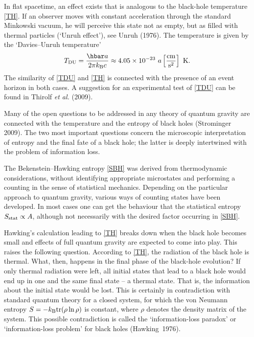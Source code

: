 \documentclass[12pt,a4paper]{article}
\newcommand{\be}{\begin{equation}}
\newcommand{\ee}{\end{equation}}
\newcommand{\lb}{\label}
\begin{document}
In flat spacetime, an effect exists that is analogous to the
black-hole temperature \eqref{TH}. If an observer moves with constant
acceleration through the standard Minkowski vacuum, he will perceive this
state not as empty, but as filled with thermal particles (`Unruh
effect'), see Unruh (1976). The temperature is given by the
`Davies--Unruh temperature' 
\be 
\lb{TDU}
T_{\rm DU}= \frac{\hbar a}{2\pi k_{\rm B}c}\approx 4.05\times 10^{-23}
\ a\left[\frac{\rm cm}{{\rm s}^2}\right]\ {\rm K} .
\ee
The similarity of \eqref{TDU} and \eqref{TH} is connected with the
presence of an event horizon in both cases. A suggestion for an
experimental test of \eqref{TDU} can be found in Thirolf {\em et al.}
(2009). 

Many of the open questions to be addressed
in any theory of quantum gravity are connected with the temperature
and the entropy of black holes (Strominger 2009). 
The two most important questions
concern the microscopic interpretation of entropy
and the final fate of a black hole; the latter is deeply intertwined
with the problem of information loss.

The Bekenstein--Hawking entropy \eqref{SBH} was derived from
thermodynamic considerations, without identifying appropriate
microstates and performing a counting in the sense of statistical
mechanics. Depending on the particular approach to quantum gravity, various ways
of counting states have been developed. In most cases one can get the
behaviour that the statistical entropy $S_{\rm stat}\propto A$,
although not necessarily with the desired factor occurring in
\eqref{SBH}. 

Hawking's calculation leading to \eqref{TH} breaks down when the black
hole becomes small and effects of full quantum gravity are expected to
come into play. This raises the following question. According to
\eqref{TH}, the radiation of the black hole is thermal. What, then,
happens in the final phase of the black-hole evolution? If only
thermal radiation were left, all initial states that lead to a black
hole would end up in one and the same final state -- a thermal state.
That is, the information about the initial state would be lost. This
is certainly in contradiction with standard quantum theory for a
closed system, for which the von Neumann entropy $S=-k_{\rm B}{\rm
  tr}(\rho\ln\rho)$ is constant, where $\rho$ denotes the density
matrix of the system. This possible contradiction is called
 the `information-loss
paradox' or `information-loss problem' for black holes
(Hawking~1976). 
\end{document}

